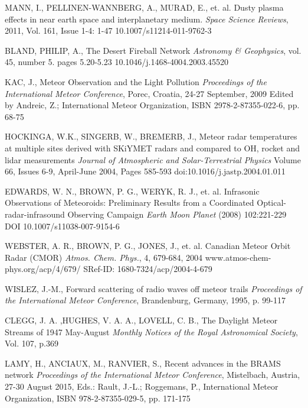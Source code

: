 \documentclass[twoside]{ctuthesis}
\theoremstyle{plain}
\theoremstyle{definition}
\theoremstyle{note}
\begin{document}
\appendix

\printindex

\appendix

\begin{thebibliography}{99}




MANN, I., PELLINEN-WANNBERG, A., MURAD, E., et. al.
Dusty plasma effects in near earth space and interplanetary medium.
\emph{Space Science Reviews}, 2011, Vol. 161, Issue 1-4: 1-47 
10.1007/s11214-011-9762-3 

BLAND, PHILIP, A.,
The Desert Fireball Network
\emph{Astronomy \& Geophysics}, vol. 45, number 5. pages 5.20-5.23
10.1046/j.1468-4004.2003.45520

KAC, J.,
Meteor Observation and the Light Pollution
\emph{Proceedings of the International Meteor Conference}, Porec, Croatia, 24-27 September, 2009 Edited by Andreic, Z.;  International Meteor Organization, ISBN 2978-2-87355-022-6, pp. 68-75

HOCKINGA, W.K., SINGERB, W., BREMERB, J.,
Meteor radar temperatures at multiple sites derived with SKiYMET radars and compared to OH, rocket and lidar measurements
\emph{Journal of Atmospheric and Solar-Terrestrial Physics}
Volume 66, Issues 6-9, April-June 2004, Pages 585-593
doi:10.1016/j.jastp.2004.01.011

EDWARDS, W. N., BROWN, P. G., WERYK, R. J., et. al.
Infrasonic Observations of Meteoroids: Preliminary Results from a Coordinated Optical-radar-infrasound Observing Campaign
\emph{Earth Moon Planet} (2008) 102:221-229
DOI 10.1007/s11038-007-9154-6

WEBSTER, A. R., BROWN, P. G., JONES, J., et. al.
Canadian Meteor Orbit Radar (CMOR)
\emph{Atmos. Chem. Phys.}, 4, 679-684, 2004
www.atmos-chem-phys.org/acp/4/679/
SRef-ID: 1680-7324/acp/2004-4-679

WISLEZ, J.-M.,
Forward scattering of radio waves off meteor trails
\emph{Proceedings of the International Meteor Conference}, Brandenburg, Germany, 1995, p. 99-117

CLEGG, J. A. ,HUGHES,  V. A. A., LOVELL, C. B., 
The Daylight Meteor Streams of 1947 May-August
\emph{Monthly Notices of the Royal Astronomical Society}, Vol. 107, p.369

LAMY, H., ANCIAUX, M., RANVIER, S.,
Recent advances in the BRAMS network
\emph{Proceedings of the International Meteor Conference}, Mistelbach, Austria, 27-30 August 2015, Eds.: Rault, J.-L.; Roggemans, P., International Meteor Organization, ISBN 978-2-87355-029-5, pp. 171-175


\end{thebibliography}
\end{document}
